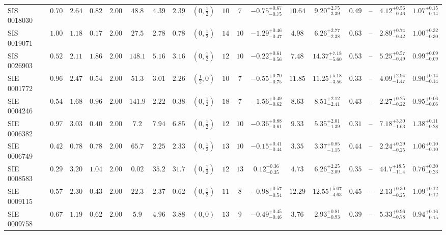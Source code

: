 \begin{longtable}{@{}lccccccccccccccccc@{}}
SIS 0018030 & $0.70$ & $2.64$ & $0.82$ & $2.00$ & $48.8$ & $4.39$ & $2.39$ & $(0,\frac12)$ & $10$ & $7$ & $-0.75^{+0.67}_{-0.75}$ & $10.64$ & $9.20^{+2.75}_{-3.39}$ & $0.49$ & -- & $4.12^{+0.56}_{-0.46}$ & $1.07^{+0.15}_{-0.14}$\\
SIS 0019071 & $1.00$ & $1.18$ & $0.17$ & $2.00$ & $27.5$ & $2.78$ & $0.78$ & $(0,\frac12)$ & $14$ & $10$ & $-1.29^{+0.46}_{-0.47}$ & $4.98$ & $6.26^{+2.77}_{-2.38}$ & $0.63$ & -- & $2.89^{+0.74}_{-0.42}$ & $1.00^{+0.32}_{-0.30}$\\
SIS 0026903 & $0.52$ & $2.11$ & $1.86$ & $2.00$ & $148.1$ & $5.16$ & $3.16$ & $(0,\frac12)$ & $12$ & $10$ & $-0.22^{+0.61}_{-0.56}$ & $7.48$ & $14.37^{+7.18}_{-5.60}$ & $0.53$ & -- & $5.25^{+0.57}_{-0.49}$ & $0.99^{+0.09}_{-0.09}$\\
SIE 0001772 & $0.96$ & $2.47$ & $0.54$ & $2.00$ & $51.3$ & $3.01$ & $2.26$ & $(\frac12,0)$ & $10$ & $7$ & $-0.55^{+0.70}_{-0.75}$ & $11.85$ & $11.25^{+5.18}_{-3.56}$ & $0.33$ & -- & $4.09^{+2.94}_{-1.47}$ & $0.90^{+0.14}_{-0.14}$\\
SIE 0004246 & $0.54$ & $1.68$ & $0.96$ & $2.00$ & $141.9$ & $2.22$ & $0.38$ & $(0,\frac12)$ & $18$ & $7$ & $-1.56^{+0.49}_{-0.62}$ & $8.63$ & $8.51^{+2.12}_{-2.41}$ & $0.43$ & -- & $2.27^{+0.25}_{-0.22}$ & $0.95^{+0.06}_{-0.06}$\\
SIE 0006382 & $0.97$ & $3.03$ & $0.40$ & $2.00$ & $7.2$ & $7.94$ & $6.85$ & $(0,\frac12)$ & $12$ & $10$ & $-0.36^{+0.88}_{-0.61}$ & $9.33$ & $5.35^{+2.01}_{-1.39}$ & $0.31$ & -- & $7.18^{+3.30}_{-1.63}$ & $1.38^{+0.11}_{-0.28}$\\
SIE 0006749 & $0.42$ & $0.78$ & $0.78$ & $2.00$ & $65.7$ & $2.25$ & $2.33$ & $(0,\frac12)$ & $13$ & $10$ & $-0.15^{+0.41}_{-0.44}$ & $3.35$ & $3.37^{+0.85}_{-1.15}$ & $0.44$ & -- & $2.24^{+0.29}_{-0.25}$ & $1.06^{+0.10}_{-0.10}$\\
SIE 0008583 & $0.29$ & $3.20$ & $1.04$ & $2.00$ & $0.02$ & $35.2$ & $31.7$ & $(0,\frac12)$ & $12$ & $13$ & $0.12^{+0.36}_{-0.35}$ & $4.73$ & $6.26^{+2.25}_{-2.09}$ & $0.35$ & -- & $44.7^{+18.5}_{-11.4}$ & $0.76^{+0.30}_{-0.23}$\\
SIE 0009115 & $0.57$ & $2.30$ & $0.43$ & $2.00$ & $22.3$ & $2.37$ & $0.62$ & $(0,\frac12)$ & $11$ & $8$ & $-0.98^{+0.57}_{-0.54}$ & $12.29$ & $12.55^{+5.07}_{-4.63}$ & $0.45$ & -- & $2.13^{+0.30}_{-0.25}$ & $1.09^{+0.12}_{-0.12}$\\
SIE 0009758 & $0.67$ & $1.19$ & $0.62$ & $2.00$ & $5.9$ & $4.96$ & $3.88$ & $(0,0)$ & $13$ & $9$ & $-0.49^{+0.45}_{-0.46}$ & $3.76$ & $2.93^{+0.81}_{-0.93}$ & $0.39$ & -- & $5.33^{+0.96}_{-0.78}$ & $0.94^{+0.16}_{-0.15}$\\

\end{longtable}
